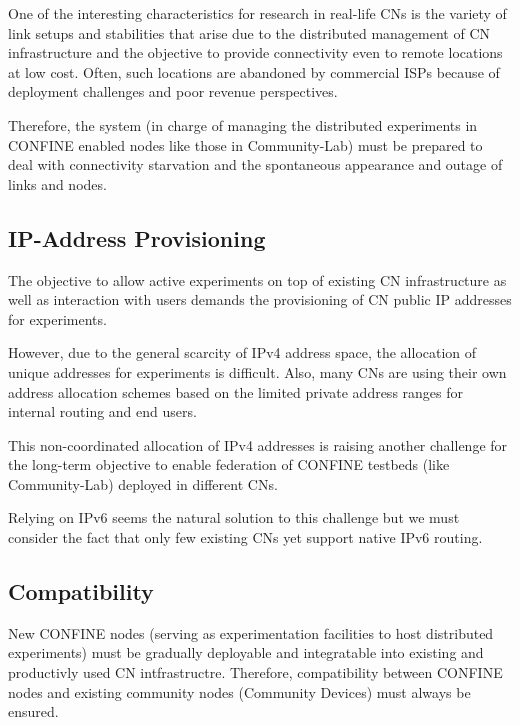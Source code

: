 \documentclass[conference]{IEEEtran}
\begin{document}
One of the interesting characteristics for research in real-life CNs
is the variety of link setups and stabilities that arise due to the
distributed management of CN infrastructure and the objective to provide
connectivity even to remote locations at low cost. Often, such
locations are abandoned by commercial ISPs because of deployment
challenges and poor revenue perspectives.

Therefore, the system (in charge of managing the distributed
experiments in CONFINE enabled nodes like those in Community-Lab) must be prepared to deal with
connectivity starvation and the spontaneous appearance and outage of
links and nodes.


\subsection{IP-Address Provisioning}

The objective to allow active experiments on top of existing CN
infrastructure as well as interaction with users demands the
provisioning of CN public IP addresses for experiments.

However, due to the general scarcity of IPv4 address space, the
allocation of unique addresses for experiments is difficult. Also,
many CNs are using their own address allocation schemes based on the
limited private address ranges for internal routing and end users.

This non-coordinated allocation of IPv4 addresses is raising another
challenge for the long-term objective to enable federation of CONFINE
testbeds (like Community-Lab) deployed in different CNs.

Relying on IPv6 seems the natural solution to this challenge but we must
consider the fact that only few existing CNs yet support native IPv6
routing.

\subsection{Compatibility}

New CONFINE nodes (serving as experimentation facilities to host
distributed experiments) must be gradually deployable and integratable
into existing and productivly used CN intfrastructre.
Therefore, compatibility between CONFINE nodes and existing community
nodes (Community Devices) must always be ensured.
\end{document}
